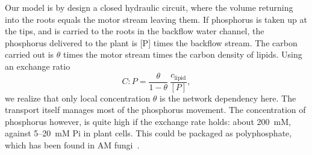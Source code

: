 Our model is by design a closed hydraulic circuit, where the volume returning into the roots equals the motor stream leaving them.
If phosphorus is taken up at the tips, and is carried to the roots in the backflow water channel, the phosphorus delivered to the plant is [P] times the backflow stream. The carbon carried out is $\theta$ times the motor stream times the carbon density of lipids. Using an exchange ratio
\begin{equation}
\label{eq:cp_ratio}
C : P = \frac{\theta}{1-\theta}\, \frac{c_\mathrm{lipid}}{[P]},
\end{equation}
we realize that only local concentration $\theta$ is the network dependency here. The transport itself manages most of the phosphorus movement. The concentration of phosphorus however, is quite high if the exchange rate holds: about 200~mM, against 5--20~mM Pi in plant cells. This could be packaged as polyphosphate, which has been found in AM fungi~\cite{hijikata_polyphosphate_2010,kikuchi_aquaporin-mediated_2016}.

